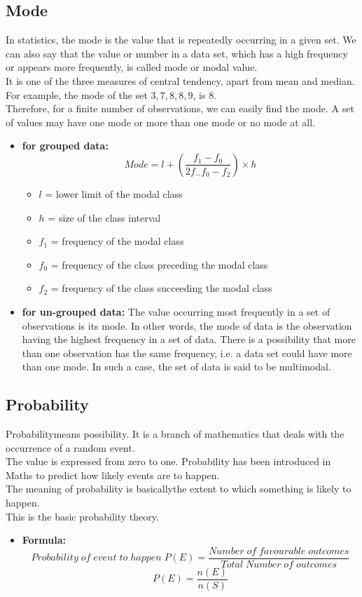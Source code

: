 \documentclass[12pt]{article}
\begin{document}
\subsection{Mode}
In statistics, the mode is the value that is repeatedly occurring in a given set. We can also say that the value or number in a data set, which has a high frequency or appears more frequently, is called mode or modal value. \\
It is one of the three measures of central tendency, apart from mean and median. For example, the mode of the set ${3, 7, 8, 8, 9}$, is $8$. \\
Therefore, for a finite number of observations, we can easily find the mode. A set of values may have one mode or more than one mode or no mode at all.\\
\begin{itemize}
    \item  \textbf{for grouped data:}
    $$ Mode = l + \left(\frac{f_1 - f_0}{2f_-f_0-f_2}\right)\times h $$
    \begin{itemize}
        \item $l$ = lower limit of the modal class
        \item $h$ = size of the class interval
        \item $f_1$ = frequency of the modal class
        \item $f_0$ = frequency of the class preceding the modal class
        \item $f_2$ = frequency of the class succeeding the modal class
    \end{itemize}
    \item \textbf{for un-grouped data:}
    The value occurring most frequently in a set of observations is its mode. In other words, the mode of data is the observation having the highest frequency in a set of data. There is a possibility that more than one observation has the same frequency, i.e. a data set could have more than one mode. In such a case, the set of data is said to be multimodal.
\end{itemize}
\subsection{Probability}
Probabilitymeans possibility. It is a branch of mathematics that deals with the occurrence of a random event. \\
The value is expressed from zero to one. Probability has been introduced in Maths to predict how likely events are to happen.\\
The meaning of probability is basicallythe extent to which something is likely to happen.\\
This is the basic probability theory.\\
\begin{itemize}
    \item \textbf{Formula:}
    $$ Probability \; of \; event \;to \;happen \;P(E) = \frac{Number \;of \;favourable \;outcomes}{Total \;Number \;of \;outcomes}$$
    $$ P(E) = \frac{n(E)}{n(S)} $$
\end{itemize}
\pagebreak
\end{document}
